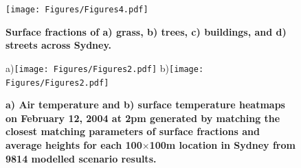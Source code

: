 \documentclass[final,3p,times,authoryear]{elsarticle}
\begin{document}
\begin{figure}
\centering
\texttt{[image: Figures/Figures4.pdf]}
\caption{\bf Surface fractions of a) grass, b) trees, c) buildings, and d) streets across Sydney.}
 \label{fig:sydfracs}
\end{figure}

\begin{figure}
\centering
a)\texttt{[image: Figures/Figures2.pdf]}
b)\texttt{[image: Figures/Figures2.pdf]}
\caption{\bf a) Air temperature and b) surface temperature heatmaps on February 12, 2004 at 2pm generated by matching the closest matching parameters of surface fractions and average heights for each 100$\times$100m location in Sydney from 9814 modelled scenario results.  }
 \label{fig:TaSyd}
\end{figure}








\end{document}
